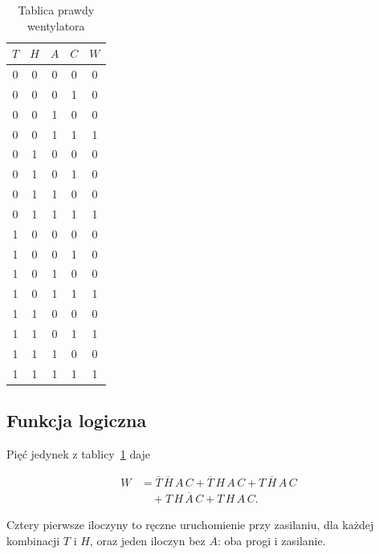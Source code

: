 \begin{table}[H]
    \centering
    \caption{Tablica prawdy wentylatora}
    \label{tab:z3-prawda}
    \begin{tabular}{|c|c|c|c|c|}
        \hline
        $T$ & $H$ & $A$ & $C$ & $W$ \\
        \hline
        0 & 0 & 0 & 0 & 0 \\
        \hline
        0 & 0 & 0 & 1 & 0 \\
        \hline
        0 & 0 & 1 & 0 & 0 \\
        \hline
        0 & 0 & 1 & 1 & 1 \\
        \hline
        0 & 1 & 0 & 0 & 0 \\
        \hline
        0 & 1 & 0 & 1 & 0 \\
        \hline
        0 & 1 & 1 & 0 & 0 \\
        \hline
        0 & 1 & 1 & 1 & 1 \\
        \hline
        1 & 0 & 0 & 0 & 0 \\
        \hline
        1 & 0 & 0 & 1 & 0 \\
        \hline
        1 & 0 & 1 & 0 & 0 \\
        \hline
        1 & 0 & 1 & 1 & 1 \\
        \hline
        1 & 1 & 0 & 0 & 0 \\
        \hline
        1 & 1 & 0 & 1 & 1 \\
        \hline
        1 & 1 & 1 & 0 & 0 \\
        \hline
        1 & 1 & 1 & 1 & 1 \\
        \hline
    \end{tabular}
\end{table}

\subsection{Funkcja logiczna}

Pięć jedynek z tablicy~\ref{tab:z3-prawda} daje

\begin{align*}
W &= \overline{T}\,\overline{H}\,A\,C + \overline{T}\,H\,A\,C + T\,\overline{H}\,A\,C \\
  &\quad + T\,H\,\overline{A}\,C + T\,H\,A\,C.
\end{align*}

Cztery pierwsze iloczyny to ręczne uruchomienie przy zasilaniu, dla każdej kombinacji $T$ i $H$, oraz jeden iloczyn bez $A$: oba progi i zasilanie.

